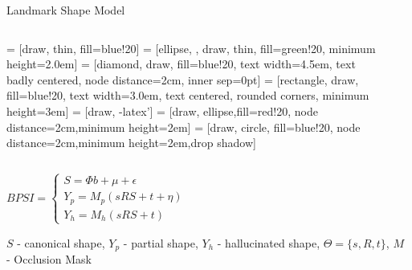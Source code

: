 \documentclass[final,red]{beamer}
\begin{document}
\begin{frame}{}
\begin{columns}[t]
\begin{column}{.3\linewidth}
\begin{block}{Landmark Shape Model}
\begin{columns}
 = [draw, thin, fill=blue!20]
   = [ellipse, , draw, thin, fill=green!20, minimum
    height=2.0em]
   = [diamond, draw, fill=blue!20,
    text width=4.5em, text badly centered, node distance=2cm, inner sep=0pt]
   = [rectangle, draw, fill=blue!20,
    text width=3.0em, text centered, rounded corners, minimum height=3em]
   = [draw, -latex']
   = [draw, ellipse,fill=red!20, node
    distance=2cm,minimum height=2em]
   = [draw, circle, fill=blue!20, node
    distance=2cm,minimum height=2em,drop shadow]
\begin{column}{0.4\linewidth}    
\begin{center}
\begin{figure}
\end{figure}
\end{center}
\end{column}
\end{columns}

\vspace{1cm}
\begin{center}
      $ BPSI =  \begin{cases} S = \Phi b + \mu + \epsilon \\ Y_p = M_p(sRS+t+\eta) \\ Y_h = M_h(sRS+t)\end{cases}$
\end{center}
{\small $S$ - canonical shape, $Y_p$ - partial shape, $Y_h$ - hallucinated shape, $\Theta=\{s,R,t\}$, $M$ - Occlusion Mask}


\end{block}
\end{column}
\end{columns}
\end{frame}
\end{document}
